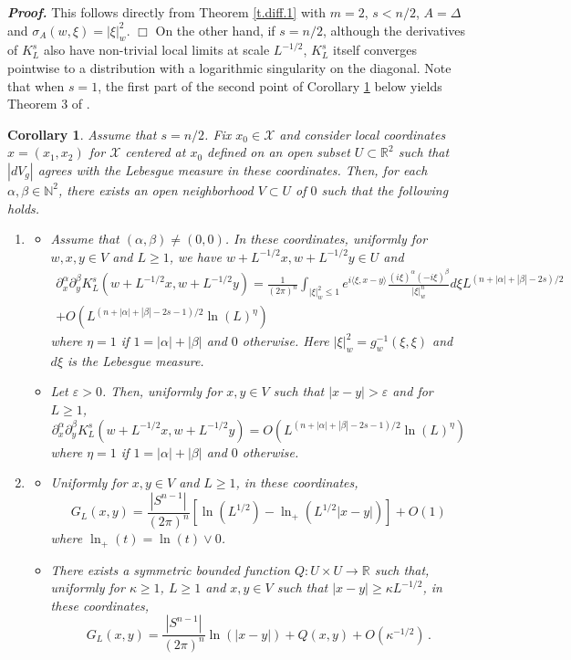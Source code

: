\documentclass[10pt,twoside]{article}
\newcommand{\eps}{\varepsilon}
\newcommand{\R}{\mathbb{R}}
\newcommand{\N}{\mathbb{N}}
\newcommand{\man}{\mathcal{X}}
\newenvironment{prf}[1][]
{\vskip 2mm  {\it \bf Proof#1. }}{$\Box$ \vskip 2mm}
\numberwithin{theorem}{section}
\newtheorem{corollary}[theorem]{Corollary}
\begin{document}
\begin{prf}
This follows directly from Theorem \ref{t.diff.1} with $m=2$, $s<n/2$, $A=\Delta$ and $\sigma_A(w,\xi)=|\xi|_w^2$.
\end{prf}
On the other hand, if $s=n/2$, although the derivatives of $K^s_L$ also have non-trivial local limits at scale $L^{-1/2}$, $K^s_L$ itself converges pointwise to a distribution with a logarithmic singularity on the diagonal. Note that when $s=1$, the first part of the second point of Corollary \ref{c.gff.2} below yields Theorem 3 of \cite{ale161}.
\begin{corollary}\label{c.gff.2}
Assume that $s=n/2$. Fix $x_0\in\man$ and consider local coordinates $x=(x_1,x_2)$ for $\man$ centered at $x_0$ defined on an open subset $U\subset\R^2$ such that $|dV_g|$ agrees with the Lebesgue measure in these coordinates. Then, for each $\alpha,\beta\in\N^2$, there exists an open neighborhood $V\subset U$ of $0$ such that the following holds.
\begin{enumerate}
\item
\begin{itemize}
\item Assume that $(\alpha,\beta)\neq(0,0)$. In these coordinates, uniformly for $w,x,y\in V$ and $L\geq 1$, we have $w+L^{-1/2}x,w+L^{-1/2}y\in U$ and
\begin{multline*}
\partial^\alpha_x\partial^\beta_yK^s_L\left(w+L^{-1/2}x,w+L^{-1/2}y\right)=\frac{1}{(2\pi)^n}\int_{|\xi|_w^2\leq 1} e^{i\langle\xi,x-y\rangle}\frac{(i\xi)^\alpha(-i\xi)^\beta}{|\xi|_w^n}d\xi L^{(n+|\alpha|+|\beta|-2s)/2}\\
+O\left(L^{(n+|\alpha|+|\beta|-2s-1)/2}\ln(L)^\eta\right)
\end{multline*}
where $\eta=1$ if $1=|\alpha|+|\beta|$ and $0$ otherwise. Here $|\xi|_w^2=g_w^{-1}(\xi,\xi)$ and $d\xi$ is the Lebesgue measure.
\item Let $\eps>0$. Then, uniformly for $x,y\in V$ such that $|x-y|>\eps$ and for $L\geq 1$,
\[
\partial_x^\alpha\partial_y^\beta K^s_L\left(w+L^{-1/2}x,w+L^{-1/2}y\right)=O\left(L^{(n+|\alpha|+|\beta|-2s-1)/2}\ln\left(L\right)^\eta\right)
\]
where $\eta=1$ if $1=|\alpha|+|\beta|$ and $0$ otherwise.
\end{itemize}
\item
\begin{itemize}
\item Uniformly for $x,y\in V$ and $L\geq 1$, in these coordinates,
\[
G_L(x,y)=\frac{\left|S^{n-1}\right|}{(2\pi)^n}\left[\ln\left(L^{1/2}\right)-\ln_+\left(L^{1/2}|x-y|\right)\right]+O(1)
\]
where $\ln_+(t)=\ln(t)\vee 0$.
\item There exists a symmetric bounded function $Q:U\times U\rightarrow\R$ such that, uniformly for $\kappa\geq 1$, $L\geq 1$ and $x,y\in V$ such that $|x-y|\geq \kappa L^{-1/2}$, in these coordinates,
\[
G_L(x,y)=\frac{\left|S^{n-1}\right|}{(2\pi)^n}\ln(|x-y|)+Q(x,y)+O\left(\kappa^{-1/2}\right)\, .
\]
\end{itemize}
\end{enumerate}
\end{corollary}
\end{document}
